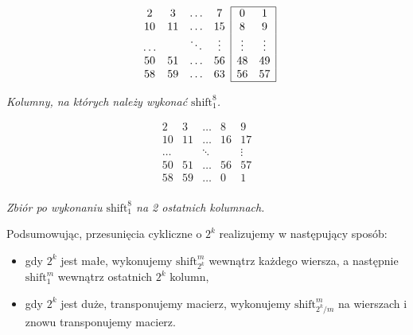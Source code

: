 \documentclass[a4paper]{article}
\newcommand{\shift}[2]{\text{shift}_{#2}^{#1}}
\theoremstyle{definition}
\begin{document}
\begin{minipage}{.5\textwidth} %

\[
\begin{array}{c c  c c}
 2  &  3 & \ldots & 7 \\
 10 & 11 & \ldots & 15 \\
\ldots & & \ddots &  \vdots \\
 50 & 51 & \ldots & 56  \\
 58 & 59 & \ldots & 63  \\ 
\end{array}
\begin{array}{| c c |}
\hline
 0 &  1 \\
 8 &  9 \\
\vdots & \vdots \\
 48 & 49 \\
 56 & 57 \\
 \hline
\end{array}
\]

\begin{center} \it
    Kolumny, na których należy wykonać \(\shift 8 1\).
\end{center}
\end{minipage}
\begin{minipage}{.5\textwidth} %

\[
\begin{matrix}
 2  &  3 & \ldots & 8  &  9  \\
 10 & 11 & \ldots & 16 & 17\\
\ldots & & \ddots &  & \vdots \\
 50 & 51 & \ldots & 56 & 57 \\
 58 & 59 & \ldots & 0 &  1 \\ 
\end{matrix}
\]

\begin{center} \it
    Zbiór po wykonaniu \(\shift 8 1\) na 2 ostatnich kolumnach.
\end{center}
\end{minipage}

\vspace{1em}

Podsumowując, przesunięcia cykliczne o \(2^k\) realizujemy w następujący sposób:

\begin{itemize}
    \item gdy \(2^k\) jest małe, wykonujemy \(\shift{m}{2^k}\) wewnątrz każdego wiersza, a następnie \(\shift{m}{1}\) wewnątrz ostatnich \(2^k\) kolumn,
    \item gdy \(2^k\) jest duże, transponujemy macierz, wykonujemy \(\shift {m} {2^k/m} \) na wierszach i znowu transponujemy macierz.
\end{itemize}
\end{document}
